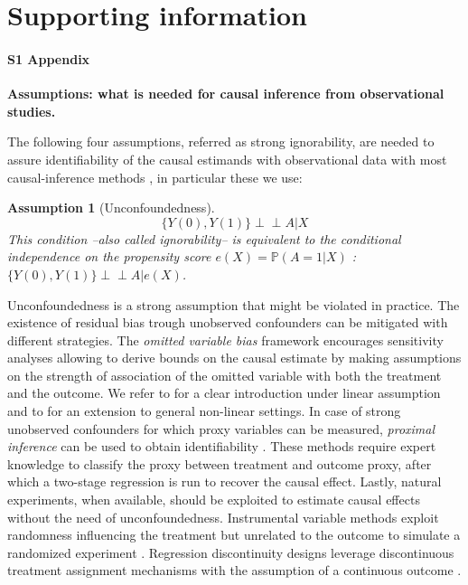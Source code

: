 \documentclass[10pt,letterpaper]{article}
\newcommand{\indep}{\perp \!\!\! \perp}
\newtheorem{assumption}{Assumption}
\begin{document}
\vspace*{0.2in}

\section*{Supporting information}

\paragraph*{S1 Appendix}
\label{apd:causal_assumptions}
{\bf Assumptions: what is needed for causal inference from observational studies.}


The following four assumptions, referred as strong ignorability, are
needed to assure identifiability of the causal estimands with observational
data with most causal-inference methods \cite{rubin2005causal}, in
particular these we use:

\begin{assumption}[Unconfoundedness]\label{assumption:ignorability}
    \begin{equation}\label{eq:ignorability}
        \{Y(0), Y(1) \} \indep A | X
    \end{equation}
    This condition --also called ignorability-- is equivalent to the conditional
    independence on the propensity score $e(X)=\mathbb P(A=1|X)$ \cite{rosenbaum1983central}: $\{Y(0), Y(1) \}\indep  A | e(X)$.
\end{assumption}

Unconfoundedness is a strong assumption that might be violated in practice. The
existence of residual bias trough unobserved confounders can be mitigated with
different strategies. The \textit{omitted variable bias} framework encourages
sensitivity analyses allowing to derive bounds on the causal estimate by making
assumptions on the strength of association of the omitted variable with both the
treatment and the outcome. We refer to \cite{cinelli2020making} for a clear
introduction under linear assumption and to \cite{chernozhukov2022long} for an
extension to general non-linear settings. In case of strong unobserved
confounders for which proxy variables can be measured, \textit{proximal
    inference} can be used to obtain identifiability
\cite{tchetgen2024introduction}. These methods require expert knowledge to
classify the proxy between treatment and outcome proxy, after which a two-stage
regression is run to recover the causal effect. Lastly, natural experiments, when
available, should be exploited to estimate causal effects without the need of
unconfoundedness. Instrumental variable methods exploit randomness influencing
the treatment but unrelated to the outcome to simulate a randomized experiment
\cite[chapter 9]{wager2020stats}. Regression discontinuity designs leverage
discontinuous treatment assignment mechanisms with the assumption of a
continuous outcome \cite[chapter 5]{wager2020stats}.
\end{document}
